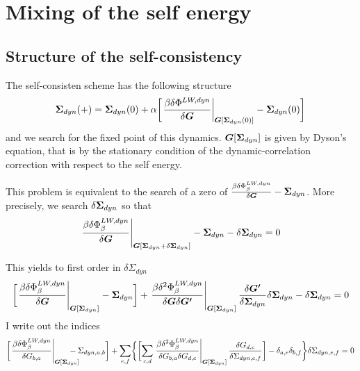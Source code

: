 \documentclass[11pt,a4paper]{report}
\begin{document}
\chapter{Mixing of the self energy}
\label{sec:mixing}
\section{Structure of the self-consistency}
The self-consisten scheme has the following structure
\begin{eqnarray}
\bm{\Sigma}_{dyn}(+)=\bm{\Sigma}_{dyn}(0)+\alpha
\biggl[\left.\frac{\beta\delta\Phi^{LW,dyn}}{\delta\bm{G}}
\right|_{\bm{G}[\bm{\Sigma}_{dyn}(0)]}
-\bm{\Sigma}_{dyn}(0)\biggr]
\end{eqnarray}
and we search for the fixed point of this
dynamics. $\bm{G}[\bm{\Sigma}_{dyn}]$ is given by Dyson's equation,
that is by the stationary condition of the dynamic-correlation
correction with respect to the self energy.

This problem is equivalent to the search of a zero of
$\frac{\beta\delta\Phi^{LW,dyn}_\beta}{\delta\bm{G}}-\bm{\Sigma}_{dyn}$.
More precisely, we search $\delta\bm{\Sigma}_{dyn}$ so that
\begin{eqnarray}
\left.\frac{\beta\delta\Phi^{LW,dyn}_\beta}{\delta\bm{G}}
\right|_{\bm{G}[\bm{\Sigma}_{dyn}+\delta\bm{\Sigma}_{dyn}]}
-\bm{\Sigma}_{dyn}
-\delta\bm{\Sigma}_{dyn}
=0
\end{eqnarray}

This yields to first order in $\delta\Sigma_{dyn}$
\begin{eqnarray}
\biggl[\left.\frac{\beta\delta\Phi^{LW,dyn}_\beta}{\delta\bm{G}}
\right|_{\bm{G}[\bm{\Sigma}_{dyn}]}
-\bm{\Sigma}_{dyn}
\biggr]
+\left.\frac{\beta\delta^2\Phi^{LW,dyn}_\beta}{\delta\bm{G}\delta\bm{G'}}
\right|_{\bm{G}[\bm{\Sigma}_{dyn}]}\frac{\delta\bm{G'}}{\delta\bm{\Sigma}_{dyn}}
\delta\bm{\Sigma}_{dyn}
-\delta\bm{\Sigma}_{dyn}
=0
\end{eqnarray}
I write out the indices
\begin{eqnarray}
\biggl[\left.\frac{\beta\delta\Phi^{LW,dyn}_\beta}{\delta G_{b,a}}
\right|_{\mat{G}[\mat{\Sigma}_{dyn}]}\hspace{-0.5cm}
-\Sigma_{dyn,a,b}
\biggr]
+
\sum_{e,f}
\biggl\lbrace
\biggl[\sum_{c,d}
\left.\frac{\beta\delta^2\Phi^{LW,dyn}_\beta}
{\delta{G}_{b,a}\delta{G}_{d,c}}
\right|_{\mat{G}[\mat{\Sigma}_{dyn}]}
\frac{\delta{G}_{d,c}}{\delta{\Sigma}_{dyn,e,f}}
\biggr]-\delta_{a,e}\delta_{b,f}
\biggr\rbrace
\delta\Sigma_{dyn,e,f}
=0
\nonumber\\
\end{eqnarray}
\end{document}
